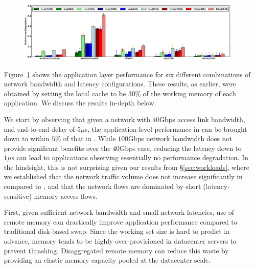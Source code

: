 %
\begin{figure}
  \centering
    \includegraphics[width = 7in]{img/vary_latency_bw.eps} 
  \caption{\small{}}
  \label{fig:latb}
\end{figure}
%
Figure~\ref{fig:latb} shows the application layer performance for six different combinations of network bandwidth and latency configurations. These results, as earlier, were obtained by setting the local cache to be $30\%$ of the working memory of each application. We discuss the results in-depth below. 

We start by observing that given a network with $40$Gbps access link bandwidth, and end-to-end delay of $5\mu$s, the application-level performance in \dis can be brought down to within $5\%$ of that in \pdis. While $100$Gbps network bandwidth does not provide significant benefits over the $40$Gbps case, reducing the latency down to $1\mu$s can lead to applications observing essentially no performance degradation. In the hindsight, this is not surprising given our results from \S\ref{sec:workloads}, where we established that the network traffic volume does not increase significantly in \dis compared to \pdis, and that the network flows are dominated by short (latency-sensitive) memory access flows. 

First, given sufficient network bandwidth and small network latencies, use of remote memory can drastically improve application performance compared to traditional disk-based swap. Since the working set size is hard to predict in advance, memory tends to be highly over-provisioned in datacenter servers to prevent thrashing. Disaggregated remote memory can reduce this waste by providing an elastic memory capacity pooled at the datacenter scale. 

